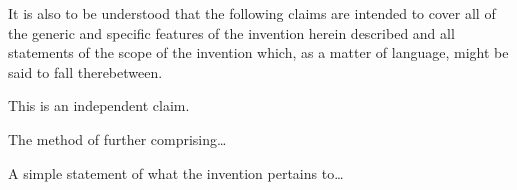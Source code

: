 \documentclass[english]{uspatent}
\begin{document}
\patentParagraph It is also to be understood that the following claims are intended to cover all of the generic and specific features of the invention herein described and all statements of the scope of the invention which, as a matter of language, might be said to fall therebetween.

\patentClaimsStart


This is an independent claim.


The method of  further comprising\ldots

\patentClaimsEnd


A simple statement of what the invention pertains to\ldots

\patentDrawings
\end{document}
